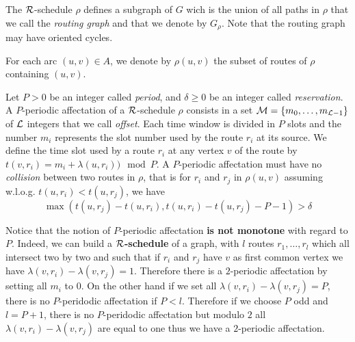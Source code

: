 \documentclass{article}
\begin{document}
The ${\cal R}$-schedule $\rho$ defines a subgraph of $G$ wich is the union of all paths in $\rho$ that we call the \emph{routing graph} and that we denote by $G_{\rho}$. 
Note that the routing graph may have oriented cycles. 



For each arc $(u,v) \in A$, we denote by ${\rho}(u,v)$ the subset of routes of $\rho$  containing $(u,v)$.


Let $P>0$ be an integer called {\em period}, and $\delta \geq 0$ be an integer called {\em reservation}. A $P$-periodic affectation of a $\cal R$-schedule $\rho$  consists in a set  ${\cal M}=\{m_0, \ldots ,m_{{\cal L}-1}\}$ of ${\cal L}$ integers that we call \emph{offset}. 
Each time window is divided in $P$ slots and the number $m_i$ represents the slot number used by the route $r_i$ at its source.
We define the time slot used by a route $r_i$ at any vertex $v$ of the route by $t(v,r_i) = m_i+\lambda(u,r_i)) \mod P$.
 A $P$-periodic affectation must have no {\em collision} between two routes in $\rho$, that is for $r_i$ and $r_j$ in ${\rho}(u,v)$ assuming w.l.o.g. $t(u,r_i) < t(u,r_j)$,
 we have $$\max(t(u,r_j)-t(u,r_i),t(u,r_i)-t(u,r_j)-P-1) > \delta $$
 
 

Notice that the notion of $P$-periodic affectation \textbf{is not monotone} with regard to $P$. 
Indeed, we can build a {\bf ${\cal R}$-schedule} of a graph, with $l$ routes $r_1, \dots, r_l$ which all intersect two by two and
such that if $r_i$ and $r_j$ have $v$ as first common vertex we have $\lambda(v,r_i) - \lambda(v,r_j)=1$.
Therefore there is a $2$-periodic affectation by setting all $m_i$ to $0$.
On the other hand if we set all $\lambda(v,r_i) - \lambda(v,r_j)=P$, there is no $P$-peridodic affectation if $P<l$.
Therefore if we choose $P$ odd and $l=P+1$, there is no $P$-peridodic affectation but modulo $2$ all $\lambda(v,r_i) - \lambda(v,r_j)$
are equal to one thus we have a $2$-periodic affectation. 
 
\end{document}
